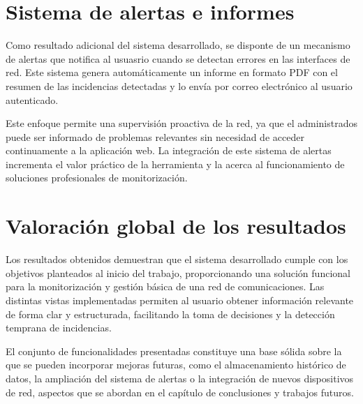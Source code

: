 \section{Sistema de alertas e informes}

Como resultado adicional del sistema desarrollado, se disponte de un mecanismo de alertas que notifica al usuasrio cuando se detectan errores en las interfaces de red. Este sistema genera automáticamente un informe en formato PDF con el resumen de las incidencias detectadas y lo envía por correo electrónico al usuario autenticado.

Este enfoque permite una supervisión proactiva de la red, ya que el administrados puede ser informado de problemas relevantes sin necesidad de acceder continuamente a la aplicación web. La integración de este sistema de alertas incrementa el valor práctico de la herramienta y la acerca al funcionamiento de soluciones profesionales de monitorización.

\section{Valoración global de los resultados}

Los resultados obtenidos demuestran que el sistema desarrollado cumple con los objetivos planteados al inicio del trabajo, proporcionando una solución funcional para la monitorización y gestión básica de una red de comunicaciones. Las distintas vistas implementadas permiten al usuario obtener información relevante de forma clar y estructurada, facilitando la toma de decisiones y la detección temprana de incidencias.

El conjunto de funcionalidades presentadas constituye una base sólida sobre la que se pueden incorporar mejoras futuras, como el almacenamiento histórico de datos, la ampliación del sistema de alertas o la integración de nuevos dispositivos de red, aspectos que se abordan en el capítulo de conclusiones y trabajos futuros.


